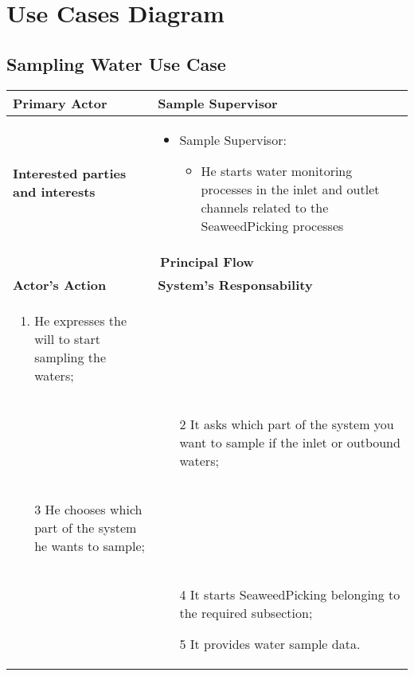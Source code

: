 \chapter{\textbf{Use Cases Diagram}}

\section{Sampling Water Use Case}

\begin{longtable}{|p{7cm}|p{7cm}|}

\hline
\textbf{Primary Actor}  & Sample Supervisor\\


\hline
\textbf{Interested parties and interests} &
\begin{itemize}
\item Sample Supervisor:
	\begin{itemize}
 	\item He starts water monitoring processes in the inlet and outlet channels related 	to the SeaweedPicking processes

	\end{itemize}
\end{itemize}
\\


\hline
\multicolumn{2}{|c|}{\textbf{Principal Flow}} \\

\hline
\textbf{Actor's Action} & \textbf{System's Responsability}\\

\hline

\begin{enumerate}
\item He expresses the will to start sampling the waters;
\end{enumerate} &\\

& 
\begin{enumerate}
\item[2]It asks which part of the system you want to sample if the inlet or outbound waters;
\end{enumerate}\\

\begin{enumerate}
\item[3]He chooses which part of the system he wants to sample;			
\end{enumerate} &\\


& 
\begin{enumerate}
\item[4]It starts SeaweedPicking belonging to the required subsection;
\item[5]It provides water sample data.
\end{enumerate}\\

\hline
\end{longtable}

